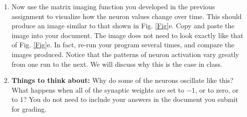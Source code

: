 \documentclass[12pt]{article}
\begin{document}
\begin{enumerate}
\item Now use the matrix imaging function you developed in the previous assignment to visualize how the neuron values change over time. This should produce an image similar to that shown in Fig. \ref{Fig}e. Copy and paste the image into your document. The image does not need to look exactly like that of Fig. \ref{Fig}e. In fact, re-run your program several times, and compare the images produced. Notice that the patterns of neuron activation vary greatly from one run to the next. We will discuss why this is the case in class.

\item \textbf{Things to think about:} Why do some of the neurons oscillate like this? What happens when all of the synaptic weights are set to $-1$, or to zero, or to $1$? You do not need to include your answers in the document you submit for grading.

\end{enumerate}
\end{document}
